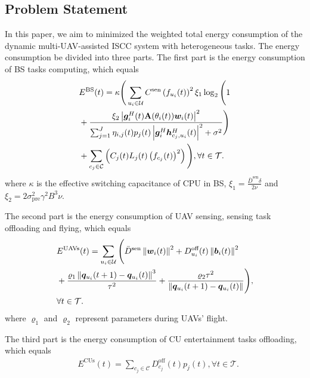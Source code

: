 \documentclass[10pt,journal,compsoc]{IEEEtran}
\begin{document}
\subsection{Problem Statement}
In this paper, we aim to minimized the weighted total energy consumption of the dynamic multi-UAV-assisted ISCC system with heterogeneous tasks.
The energy consumption be divided into three parts.
The first part is the energy consumption of BS tasks computing, which equals
\begin{align}\label{tempP0:BS-Energy-Consumption}
    & E^{\text{BS}}(t) = \kappa \Bigg( \sum_{u_{i} \in \mathcal{U}} C^{\text{sen}}\left(f_{u_{i}}(t)\right)^{2} \xi_{1} \log_2 \Bigg(1 \notag \\
    & + \frac{\xi_{2} \left|\bm{g}^{H}_{i}(t)\mathbf{A}(\theta_{i}(t)) \bm{w}_{i}(t)\right|^{2}}{\sum_{j = 1 }^{J} \eta_{i, j}(t) p_{j}(t) \left|\bm{g}_{i}^{H}\bm{h}_{c_{j}, u_{i}}^{H}(t)\right|^{2} + \sigma^{2}}\Bigg) \notag \\
    & + \sum_{c_{j} \in \mathcal{C}}\left(C_{{j}}(t)L_{j}(t)\left(f_{c_{j}}(t)\right)^{2}\right) \Bigg), \forall t \in \mathcal{T}.
\end{align}
where $\kappa$ is the effective switching capacitance of CPU in BS, 
$\xi_{1} = \frac{\bar{D}^{\text{sen}} \delta}{2\nu}$ and
$\xi_{2} = 2\sigma_{\text{pre}}^{2}\gamma^{2}B^{3} \nu$.

The second part is the energy consumption of UAV sensing, sensing task offloading and flying, which equals
\begin{align}\label{tempP0:UAV-Flying-Energy-Consumption}
    & E^{\text{UAVs}}(t) = \sum_{u_{i} \in \mathcal{U}} \Bigg(\bar{D}^{\text{sen}}\left\|\bm{w}_{i}(t)\right\|^{2} + D_{u_{i}}^{\text{off}}(t)\left\|\bm{b}_{i}(t)\right\|^{2}  \notag \\
    & + \frac{\varrho_{1}\left\|\bm{q}_{u_{i}}(t + 1) - \bm{q}_{u_{i}}(t)\right\|^{3}}{\tau^2} + \frac{\varrho_{2}\tau^2}{\left\|\bm{q}_{u_{i}}(t + 1) - \bm{q}_{u_{i}}(t)\right\|}\Bigg), \notag \\
    &  \forall t \in \mathcal{T}.
\end{align}
where $\varrho_{1}$ and $\varrho_{2}$ represent parameters during UAVs' flight.

The third part is the energy consumption of CU entertainment tasks offloading, which equals
\begin{align}\label{tempP0:UAV-Flying-Energy-Consumption}
    & E^{\text{CUs}}(t) = \sum_{c_{j} \in \mathcal{C}} D_{c_{j}}^{\text{off}}(t)p_{j}(t), \forall t \in \mathcal{T}.
\end{align}
\end{document}

